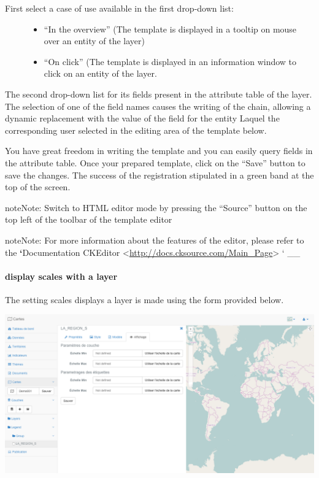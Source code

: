 \documentclass[letterpaper,10pt,english]{sphinxmanual}
\begin{document}
\begin{description}
\item[{First select a case of use available in the first drop-down list:}] \leavevmode\begin{itemize}
\item {} 
``In the overview'' (The template is displayed in a tooltip on mouse over an entity of the layer)

\item {} 
``On click'' (The template is displayed in an information window to click on an entity of the layer.

\end{itemize}

\end{description}

The second drop-down list for its fields present in the attribute table of the layer. The selection of one of the field names causes the writing of the chain, allowing a dynamic replacement with the value of the field for the entity Laquel the corresponding user selected in the editing area of ​​the template below.

You have great freedom in writing the template and you can easily query fields in the attribute table. Once your prepared template, click on the ``Save'' button to save the changes. The success of the registration stipulated in a green band at the top of the screen.

\begin{notice}{note}{Note:}
Switch to HTML editor mode by pressing the ``Source'' button on the top left of the toolbar of the template editor
\end{notice}

\begin{notice}{note}{Note:}
For more information about the features of the editor, please refer to the {\color{red}\bfseries{}{}`}Documentation CKEditor \textless{}\href{http://docs.cksource.com/Main\_Page}{http://docs.cksource.com/Main\_Page}\textgreater{} {}` \_\_
\end{notice}


\paragraph{display scales with a layer}
\label{maps/layerstree:echelles-d-affichage-d-une-couche}
The setting scales displays a layer is made using the form provided below.

\includegraphics[width=1.000\linewidth]{layer-display-def.png}
\end{document}
